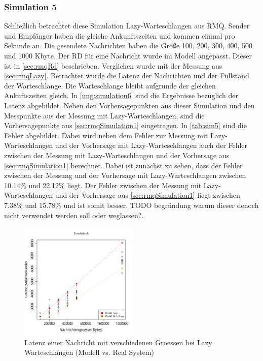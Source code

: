 \subsubsection{Simulation 5}
Schließlich betrachtet diese Simulation Lazy-Warteschlangen aus RMQ. Sender und Empfänger haben die gleiche Ankunftszeiten und kommen einmal pro Sekunde an. Die gesendete Nachrichten haben die Größe 100, 200, 300, 400, 500 und 1000 Kbyte. Der RD für eine Nachricht wurde im Modell angepasst. Dieser ist in \autoref{sec:rmqRd} beschrieben. Verglichen wurde mit der Messung aus \autoref{sec:rmqLazy}. Betrachtet wurde die Latenz der Nachrichten und der Füllstand der Warteschlange.
Die Warteschlange bleibt aufgrunde der gleichen Ankuftszeiten gleich. In \autoref{img:simulation6} sind die Ergebnisse bezüglich der Latenz abgebildet. Neben den Vorhersagepunkten aus dieser Simulation und den Messpunkte aus der Messung mit Lazy-Warteschlangen, sind die Vorhersagepunkte aus \autoref{sec:rmqSimulation1} eingetragen. In \autoref{tab:sim5} sind die Fehler abgebildet. Dabei wird neben dem Fehler zur Messung mit Lazy-Warteschlangen und der Vorhersage mit Lazy-Warteschlangen auch der Fehler zwischen der Messung mit Lazy-Warteschlangen und der Vorhersage aus \autoref{sec:rmqSimulation1} berechnet. Dabei ist zunächst zu sehen, dass der Fehler zwischen der Messung und der Vorhersage mit Lazy-Warteschlangen zwischen 10.14\% und 22.12\% liegt. Der Fehler zwischen der Messung mit Lazy-Warteschlangen und der Vorhersage aus \autoref{sec:rmqSimulation1} liegt zwischen 7.38\% und 15.78\% und ist somit besser. TODO begründung warum dieser denoch nicht verwendet werden soll oder weglassen?.
\begin{figure}
\center
  \includegraphics[width=0.5\textwidth]{images/modelSimulationResults/simulation6.pdf}
  \caption{Latenz einer Nachricht mit verschiedenen Groessen bei Lazy Warteschlangen (Modell vs. Real System)}
  \label{img:simulation6}
\end{figure}

